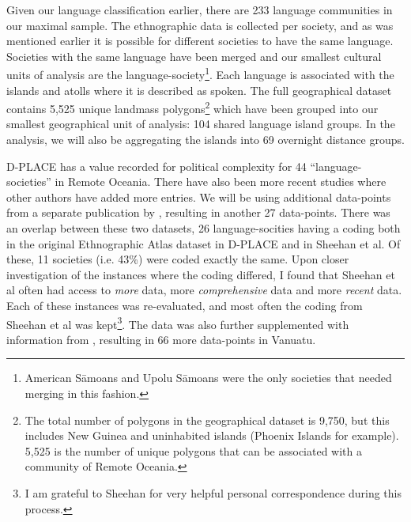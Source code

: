 \documentclass[a4paper,10pt]{article} %
\begin{document}
Given our language classification earlier, there are 233 language communities in our maximal sample. The ethnographic data is collected per society, and as was mentioned earlier it is possible for different societies to have the same language. Societies with the same language have been merged and our smallest cultural units of analysis are the language-society\footnote{American S\={a}moans and Upolu S\={a}moans were the only societies that needed merging in this fashion.}. Each language is associated with the islands and atolls where it is described as spoken. The full geographical dataset contains 5,525 unique landmass polygons\footnote{The total number of polygons in the geographical dataset is 9,750, but this includes New Guinea and uninhabited islands (Phoenix Islands for example). 5,525 is the number of unique polygons that can be associated with a community of Remote Oceania.} which have been grouped into our smallest geographical unit of analysis: 104 shared language island groups. In the analysis, we will also be aggregating the islands into 69 overnight distance groups.

D-PLACE has a value recorded for political complexity for 44 ``language-societies'' in Remote Oceania. There have also been more recent studies where other authors have added more entries. We will be using additional data-points from a separate publication by \citet{sheehan2018coevolution}, resulting in another 27 data-points. There was an overlap between these two datasets, 26 language-socities having a coding both in the original Ethnographic Atlas dataset in D-PLACE and in Sheehan et al. Of these, 11 societies (i.e. 43\%) were coded exactly the same. Upon closer investigation of the instances where the coding differed, I found that Sheehan et al often had access to \textit{more} data, more \textit{comprehensive} data and more \textit{recent} data. Each of these instances was re-evaluated, and most often the coding from Sheehan et al was kept\footnote{I am grateful to Sheehan for very helpful personal correspondence during this process.}. The data was also further supplemented with information from \citet[201]{bonnemaison1996graded}, resulting in 66 more data-points in Vanuatu. 



\end{document}
